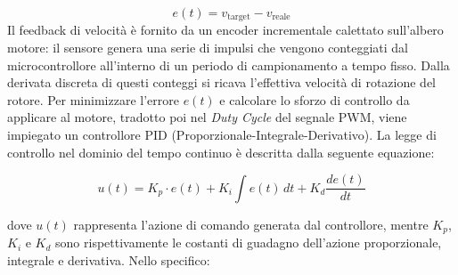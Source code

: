 \documentclass[11pt]{report}
\begin{document}
\begin{equation}
    e(t) = v_{\text{target}} - v_{\text{reale}}
\end{equation}
\noindent Il feedback di velocità è fornito da un encoder incrementale calettato sull'albero motore: il sensore genera una serie di impulsi che vengono conteggiati dal microcontrollore all'interno di un periodo di campionamento a tempo fisso. Dalla derivata discreta di questi conteggi si ricava l'effettiva velocità di rotazione del rotore.
\noindent Per minimizzare l'errore $e(t)$ e calcolare lo sforzo di controllo da applicare al motore, tradotto poi nel \textit{Duty Cycle} del segnale PWM, viene impiegato un controllore PID (Proporzionale-Integrale-Derivativo). La legge di controllo nel dominio del tempo continuo è descritta dalla seguente equazione:

\begin{equation}
    u(t) = K_p \cdot e(t) + K_i \int e(t) \, dt + K_d \frac{de(t)}{dt}
\end{equation}

\noindent dove $u(t)$ rappresenta l'azione di comando generata dal controllore, mentre $K_p$, $K_i$ e $K_d$ sono rispettivamente le costanti di guadagno dell'azione proporzionale, integrale e derivativa. Nello specifico:
\end{document}
